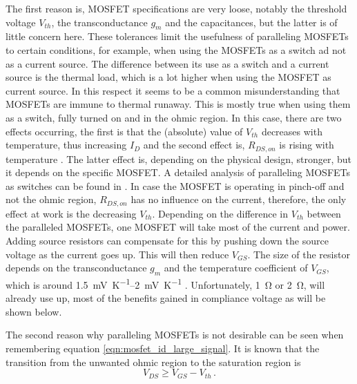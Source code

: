 The first reason is, MOSFET specifications are very loose, notably the threshold voltage $V_{th}$, the transconductance $g_m$ and the capacitances, but the latter is of little concern here. These tolerances limit the usefulness of paralleling MOSFETs to certain conditions, for example, when using the MOSFETs as a switch ad not as a current source. The difference between its use as a switch and a current source is the thermal load, which is a lot higher when using the MOSFET as current source. In this respect it seems to be a common misunderstanding that MOSFETs are immune to thermal runaway. This is mostly true when using them as a switch, fully turned on and in the ohmic region. In this case, there are two effects occurring, the first is that the (absolute) value of $V_{th}$ decreases with temperature, thus increasing $I_D$ and the second effect is, $R_{DS,on}$ is rising with temperature \cite{mosfet_thermal_runaway}. The latter effect is, depending on the physical design, stronger, but it depends on the specific MOSFET. A detailed analysis of paralleling MOSFETs as switches can be found in \cite{paralleling_mosfets}. In case the MOSFET is operating in pinch-off and not the ohmic region, $R_{DS,on}$ has no influence on the current, therefore, the only effect at work is the decreasing $V_{th}$. Depending on the difference in $V_{th}$ between the paralleled MOSFETs, one MOSFET will take most of the current and power. Adding source resistors can compensate for this by pushing down the source voltage as the current goes up. This will then reduce $V_{GS}$. The size of the resistor depends on the transconductance $g_m$ and the temperature coefficient of $V_{GS}$, which is around \qtyrange[range-units = single]{1.5}{2}{\mV \per \K} \cite{mosfet_vgs_tempco}. Unfortunately, \qty{1}{\ohm} or \qty{2}{\ohm}, will already use up, most of the benefits gained in compliance voltage as will be shown below.

The second reason why paralleling MOSFETs is not desirable can be seen when
remembering equation \ref{eqn:mosfet_id_large_signal}. It is known that the transition from the unwanted ohmic region to the saturation region is
\begin{equation}
    V_{DS} \geq V_{GS} − V_{th}\,.
\end{equation}

